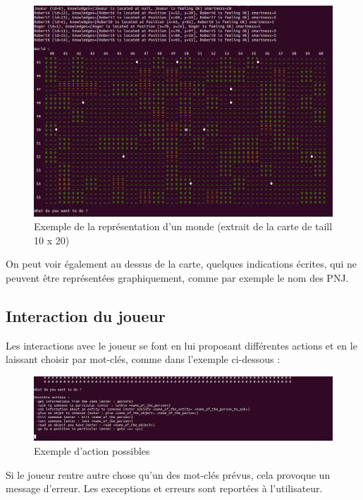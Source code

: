\documentclass[asi]{picINSA}
\begin{document}
\begin{figure}[!ht]
  \begin{center}
    \includegraphics[width=1\textwidth]{images/screenshootWorld01.png}
    \caption{Exemple de la représentation d'un monde (extrait de la carte de taill 10 x 20)}	
  \end{center}
\end{figure}
 On peut voir également au dessus de la carte, quelques indications écrites, qui ne peuvent être représentées graphiquement, comme par exemple le nom des PNJ.
\subsection{Interaction du joueur}
Les interactions avec le joueur se font en lui proposant différentes actions et en le laissant choisir par mot-clés, comme dans l'exemple ci-dessous : \\
\begin{figure}[!ht]
  \begin{center}
    \includegraphics[width=1\textwidth]{images/screenshootUI01.png}
    \caption{Exemple d'action possibles}	
  \end{center}
\end{figure}

Si le joueur rentre autre chose qu'un des mot-clés prévus, cela provoque un message d'erreur. Les  execeptions et erreurs sont reportées à l'utilisateur. \\
\end{document}

